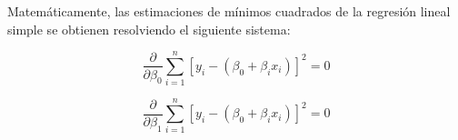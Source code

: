 Matemáticamente, las estimaciones de mínimos cuadrados de la regresión lineal simple se obtienen resolviendo el siguiente sistema:

\begin{equation}
    \dfrac{\partial}{\partial\beta_0}\sum_{i=1}^n \left[y_i-\left(\beta_0+\beta_ix_i\right)\right]^2=0
\end{equation}

\begin{equation}
    \dfrac{\partial}{\partial\beta_1}\sum_{i=1}^n \left[y_i-\left(\beta_0+\beta_ix_i\right)\right]^2=0
\end{equation}

